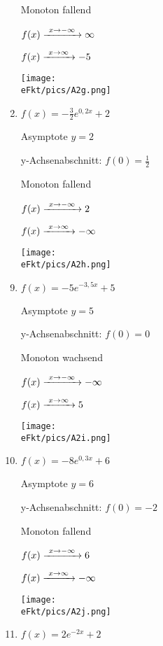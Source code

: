 \begin{Answer}[ref=eFktA2]
\begin{minipage}{\textwidth}
\begin{minipage}{0.5\textwidth}
\begin{enumerate}[label=\alph*)]
				Monoton fallend

				\(f(x)\xrightarrow{\hphantom{\ }x\to-\infty\hphantom{\ }}\infty\)

				\(f(x)\xrightarrow{\hphantom{\ }x\to\infty\hphantom{\ }}-5\)

				\texttt{[image: \\eFkt/pics/A2g.png]}
				\item \(f(x)=-\frac{3}{2}e^{0,2x}+2\)

				Asymptote \(y=2\)

				y-Achsenabschnitt: \(f(0)=\frac{1}{2}\)

				Monoton fallend

				\(f(x)\xrightarrow{\hphantom{\ }x\to-\infty\hphantom{\ }}2\)

				\(f(x)\xrightarrow{\hphantom{\ }x\to\infty\hphantom{\ }}-\infty\)

				\texttt{[image: \\eFkt/pics/A2h.png]}
			\end{enumerate}
		\end{minipage}%
	\end{minipage}
	\newpage
	\begin{minipage}{\textwidth}
		\begin{minipage}{0.5\textwidth}
			\begin{enumerate}[label=\alph*)]
				\setcounter{enumi}{8}
				\item \(f(x)=-5e^{-3,5x}+5\)

				Asymptote \(y=5\)

				y-Achsenabschnitt: \(f(0)=0\)

				Monoton wachsend

				\(f(x)\xrightarrow{\hphantom{\ }x\to-\infty\hphantom{\ }}-\infty\)

				\(f(x)\xrightarrow{\hphantom{\ }x\to\infty\hphantom{\ }}5\)

				\texttt{[image: \\eFkt/pics/A2i.png]}
				\item \(f(x)=-8e^{0,3x}+6\)

				Asymptote \(y=6\)

				y-Achsenabschnitt: \(f(0)=-2\)

				Monoton fallend

				\(f(x)\xrightarrow{\hphantom{\ }x\to-\infty\hphantom{\ }}6\)

				\(f(x)\xrightarrow{\hphantom{\ }x\to\infty\hphantom{\ }}-\infty\)

				\texttt{[image: \\eFkt/pics/A2j.png]}
			\end{enumerate}
		\end{minipage}%
		\begin{minipage}{0.5\textwidth}
			\begin{enumerate}[label=\alph*)]
				\setcounter{enumi}{10}
				\item \(f(x)=2e^{-2x}+2\)


\end{enumerate}
\end{minipage}
\end{minipage}
\end{Answer}
